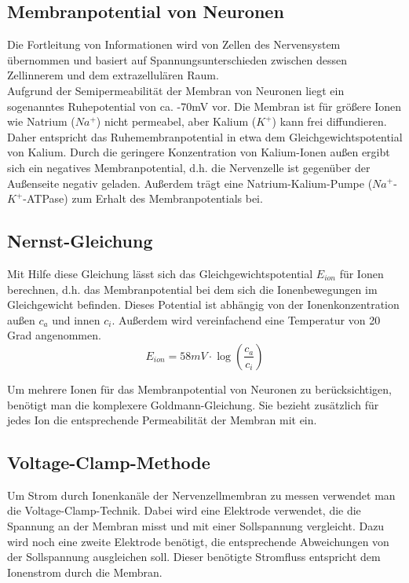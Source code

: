 \documentclass[11pt]{article}
\begin{document}
\subsection{Membranpotential von Neuronen}
Die Fortleitung von Informationen wird von Zellen des Nervensystem übernommen und basiert auf Spannungsunterschieden zwischen dessen Zellinnerem und dem extrazellulären Raum. \\
Aufgrund der Semipermeabilität der Membran von Neuronen liegt ein sogenanntes Ruhepotential von ca. -70mV vor. Die Membran ist für größere Ionen wie Natrium ($Na^{+}$) nicht permeabel, aber Kalium ($K^{+}$) kann frei diffundieren. Daher entspricht das Ruhemembranpotential in etwa dem Gleichgewichtspotential von Kalium. Durch die geringere Konzentration von Kalium-Ionen außen ergibt sich ein negatives Membranpotential, d.h. die Nervenzelle ist gegenüber der Außenseite negativ geladen. Außerdem trägt eine Natrium-Kalium-Pumpe ($Na^{+}$-$K^+$-ATPase) zum Erhalt des Membranpotentials bei.  


\subsection{Nernst-Gleichung}
Mit Hilfe diese Gleichung lässt sich das Gleichgewichtspotential $E_{ion}$ für Ionen berechnen, d.h. das Membranpotential bei dem sich die Ionenbewegungen im Gleichgewicht befinden. Dieses Potential ist abhängig von der Ionenkonzentration außen $c_a$ und innen $c_i$. Außerdem wird vereinfachend eine Temperatur von 20 Grad angenommen. 
\begin{equation}
\label{nernst}
E_{ion} = 58mV \cdot \log(\dfrac{c_a}{c_i})
\end{equation}

Um mehrere Ionen für das Membranpotential von Neuronen zu berücksichtigen, benötigt man die komplexere Goldmann-Gleichung. Sie bezieht zusätzlich für jedes Ion die entsprechende Permeabilität der Membran mit ein. 

\subsection{Voltage-Clamp-Methode}
Um Strom durch Ionenkanäle der Nervenzellmembran zu messen verwendet man die Voltage-Clamp-Technik. Dabei wird eine Elektrode verwendet, die die Spannung an der Membran misst und mit einer Sollspannung vergleicht. Dazu wird noch eine zweite Elektrode benötigt, die entsprechende Abweichungen von der Sollspannung ausgleichen soll. Dieser benötigte Stromfluss entspricht dem Ionenstrom durch die Membran. 
\end{document}
